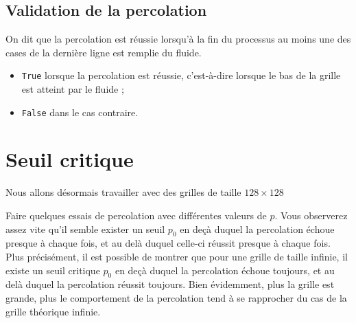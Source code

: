 \subsection*{Validation de la percolation}





On dit que la percolation est réussie lorsqu'à la fin du processus au
moins une des cases de la dernière ligne est remplie du fluide.

\begin{itemize}
\item \lstinline{True} lorsque la percolation est réussie, c'est-à-dire lorsque le bas
  de la grille est atteint par le fluide ;
\item \lstinline{False} dans le cas contraire.
\end{itemize}


%
\section*{Seuil critique}\label{seuil-critique}
%
Nous allons désormais travailler avec des grilles de taille $128\times 128$ 



Faire quelques essais de percolation avec différentes valeurs de $p$. Vous observerez assez vite qu'il semble exister un seuil $p_0$ en deçà duquel la percolation
échoue presque à chaque fois, et au delà duquel celle-ci réussit presque
à chaque fois. Plus précisément, il est possible de montrer que pour une
grille de taille infinie, il existe un seuil critique
$p_0$ en deçà duquel la percolation échoue toujours,
et au delà duquel la percolation réussit toujours. Bien évidemment, plus
la grille est grande, plus le comportement de la percolation tend à se
rapprocher du cas de la grille théorique infinie.

